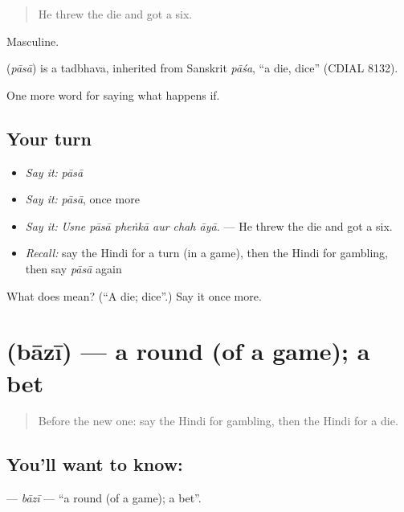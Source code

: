 \begin{quote}
He threw the die and got a six.
\end{quote}

Masculine.

\begin{cousinweb}
\textbf{} (\emph{pāsā}) is a tadbhava, inherited from Sanskrit \emph{pāśa}, \textquotedblleft{}a die, dice\textquotedblright{} (CDIAL 8132).
\end{cousinweb}

\begin{grammarlens}[title={What you've built}]
One more word for saying what happens if.
\end{grammarlens}

\subsection*{Your turn}
\begin{itemize}
\raggedright
  \item \emph{Say it:} \emph{pāsā}
  \item \emph{Say it:} \emph{pāsā}, once more
  \item \emph{Say it:} \emph{Usne pāsā pheṅkā aur chah āyā.} — He threw the die and got a six.
  \item \emph{Recall:} say the Hindi for a turn (in a game), then the Hindi for gambling, then say \emph{pāsā} again
\end{itemize}

\begin{tcolorbox}[breakable,colback=teal!4,colframe=teal!35!black,title={Before you move on}]
What does  mean? (\textquotedblleft{}A die; dice\textquotedblright{}.) Say it once more.
\end{tcolorbox}
\section[\texorpdfstring{\hi{बाज़ी} (bāzī)}{बाज़ी (bāzī)}]{ (bāzī) — a round (of a game); a bet}

\label{lesson:HI-C545-bazi}



\begin{quote}
Before the new one: say the Hindi for gambling, then the Hindi for a die.
\end{quote}

\subsection*{You'll want to know: }
\textbf{} — \emph{bāzī} — \textquotedblleft{}a round (of a game); a bet\textquotedblright{}.

